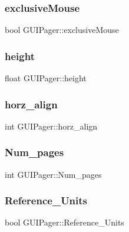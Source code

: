 \subsubsection{\texorpdfstring{exclusive\+Mouse}{exclusiveMouse}}
{\footnotesize\ttfamily bool G\+U\+I\+Pager\+::exclusive\+Mouse}

\hypertarget{class_g_u_i_pager_aa4c9735c85d5d0e7f501a8e9c67f46a7}{}\label{class_g_u_i_pager_aa4c9735c85d5d0e7f501a8e9c67f46a7} 
\subsubsection{\texorpdfstring{height}{height}}
{\footnotesize\ttfamily float G\+U\+I\+Pager\+::height}

\hypertarget{class_g_u_i_pager_a9d23c63f97b5dce24246e7f1ba8f3465}{}\label{class_g_u_i_pager_a9d23c63f97b5dce24246e7f1ba8f3465} 
\subsubsection{\texorpdfstring{horz\+\_\+align}{horz\_align}}
{\footnotesize\ttfamily int G\+U\+I\+Pager\+::horz\+\_\+align}

\hypertarget{class_g_u_i_pager_a4788e04758121ae1645550f676ad3d9b}{}\label{class_g_u_i_pager_a4788e04758121ae1645550f676ad3d9b} 
\subsubsection{\texorpdfstring{Num\+\_\+pages}{Num\_pages}}
{\footnotesize\ttfamily int G\+U\+I\+Pager\+::\+Num\+\_\+pages}

\hypertarget{class_g_u_i_pager_a1597a185dc197176f12bbf6afcee7fdd}{}\label{class_g_u_i_pager_a1597a185dc197176f12bbf6afcee7fdd} 
\subsubsection{\texorpdfstring{Reference\+\_\+\+Units}{Reference\_Units}}
{\footnotesize\ttfamily bool G\+U\+I\+Pager\+::\+Reference\+\_\+\+Units}

